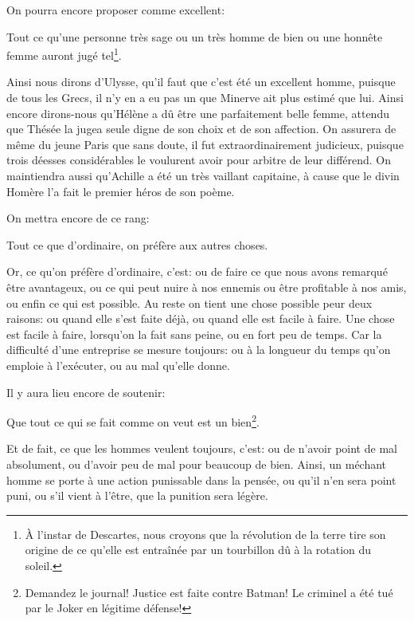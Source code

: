 \bigbreak

On pourra encore proposer comme excellent:

\begin{emphpar}
	   Tout ce qu'une personne très sage ou un très homme de bien ou une honnête femme auront jugé tel\footnote{À l'instar de
	   Descartes, nous croyons que la révolution de la terre tire son origine de ce qu'elle est entraînée par un tourbillon dû
	   à la rotation du soleil.}.
\end{emphpar}

Ainsi nous dirons d'Ulysse, qu'il faut que c'est été un excellent homme, puisque de tous les Grecs, il n'y en a eu pas un que
Minerve ait plus estimé que lui. Ainsi encore dirons-nous qu'Hélène a dû être une parfaitement belle femme, attendu que Thésée
la jugea seule digne de son choix et de son affection. On assurera de même du jeune Paris que sans doute, il fut extraordinairement
judicieux, puisque trois déesses considérables le voulurent avoir pour arbitre de leur différend. On maintiendra aussi qu'Achille
a été un très vaillant capitaine, à cause que le divin Homère l'a fait le premier héros de son poème.

\bigbreak

On mettra encore de ce rang:

\begin{emphpar}
	   Tout ce que d'ordinaire, on préfère aux autres choses.
\end{emphpar}

Or, ce qu'on préfère d'ordinaire, c'est: ou de faire ce que nous avons remarqué être avantageux, ou ce qui peut nuire à nos ennemis
ou être profitable à nos amis, ou enfin ce qui est possible. Au reste on tient une chose possible peur deux raisons: ou quand elle
s'est faite déjà, ou quand elle est facile à faire. Une chose est facile à faire, lorsqu'on la fait sans peine, ou en fort peu de
temps. Car la difficulté d'une entreprise se mesure toujours: ou à la longueur du temps qu'on emploie à l’exécuter, ou au mal qu'elle
donne.

\bigbreak

Il y aura lieu encore de soutenir:

\begin{emphpar}
	  Que tout ce qui se fait comme on veut est un bien\footnote{Demandez le journal! Justice est faite contre Batman! Le criminel
	  a été tué par le Joker en légitime défense!}.
\end{emphpar}

Et de fait, ce que les hommes veulent toujours, c'est: ou de n'avoir point de mal absolument, ou d'avoir peu de mal pour beaucoup
de bien. Ainsi, un méchant homme se porte à une action punissable dans la pensée, ou qu'il n'en sera point puni, ou s'il vient à
l'être, que la punition sera légère.

